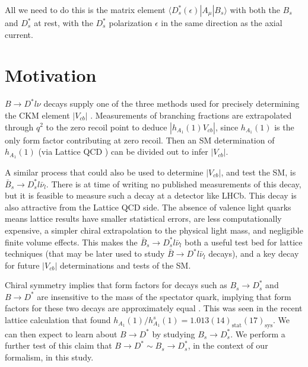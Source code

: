All we need to do this is the matrix element $\langle D^*_s(\epsilon)| A_{\mu} | B_s \rangle$ with both the $B_s$ and $D_s^*$ at rest, with the $D_s^*$ polarization $\epsilon$ in the same direction as the axial current.

\section{Motivation}
\label{sec:BsDsstar_intro}

$B\to D^{*} l \nu$ decays supply one of the three methods used for precisely determining the CKM element $|V_{cb}|$ \cite{Schroder:1994aj,PhysRevLett.64.2117,PhysRevD.43.651,ALBRECHT1992195,Barish:1994mu,BUSKULIC1996449,Buskulic:1994dz,Abbiendi:2000hk,Abreu:2001ic,Adam:2002uw,Abdallah:2004rz,Aubert:2007rs,Aubert:2007qs,Aubert:2008yv,Dungel:2010uk,Abdesselam:2017kjf,Bailey:2014tva,Abdesselam:2018nnh}.
Measurements of branching fractions are extrapolated through $q^2$ to the zero recoil point to deduce $|h_{A_1}(1)V_{cb}|$, since $h_{A_1}(1)$ is the only form factor contributing at zero recoil. Then an SM determination of $h_{A_1}(1)$ (via Lattice QCD \cite{Bailey:2014tva,Harrison:2017fmw}) can be divided out to infer $|V_{cb}|$.

A similar process that could also be used to determine $|V_{cb}|$, and test the SM, is $\bar{B}_s \to D^*_s l\bar{\nu}_l$. There is at time of writing no published measurements of this decay, but it is feasible to measure such a decay at a detector like LHCb. This decay is also attractive from the Lattice QCD side.
The absence of valence light quarks means lattice results have smaller statistical errors, are less computationally expensive, a simpler chiral extrapolation to the physical light mass, and negligible finite volume effects. This makes the $\bar{B}_s \to D^*_s l\bar{\nu}_l$ both a useful test bed for lattice techniques (that may be later used to study $\bar{B} \to D^* l \bar{\nu}_l$ decays), and a key decay for future $|V_{cb}|$ determinations and tests of the SM.

Chiral symmetry implies that form factors for decays such as $B_s \to D^*_s$ and $B \to D^*$ are insensitive to the mass of the spectator quark, implying that form factors for these two decays are approximately equal \cite{Laiho:2005ue}. This was seen in the recent lattice calculation \cite{Harrison:2017fmw} that found $h_{A_1}(1) / h^s_{A_1}(1) = 1.013(14)_{\text{stat}}(17)_{\text{sys}}$. We can then expect to learn about $B\to D^*$ by studying $B_s\to D_s^*$. We perform a further test of this claim that $B\to D^*\sim B_s\to D_s^*$, in the context of our formalism, in this study.

